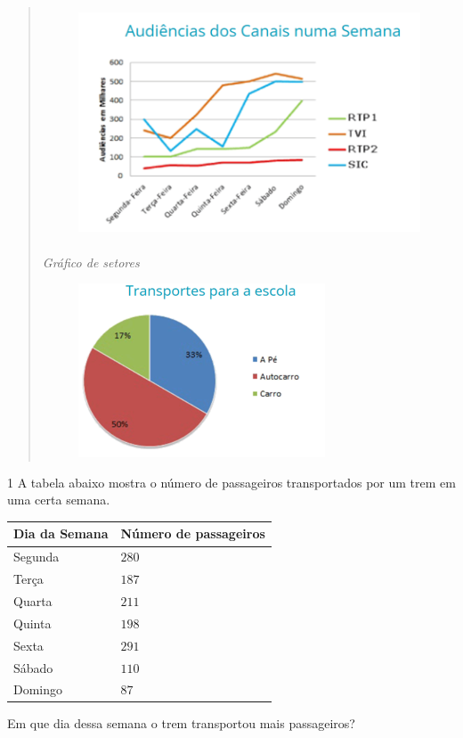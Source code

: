 {\begin{quote}
\begin{figure}
\includegraphics[width=4.1875in,height=2.6875in]{./imgSAEB_6_MAT/media/image79.png}
\end{figure}

\noindent\textit{Gráfico de setores}\\

\begin{figure}
\includegraphics[width=2.88542in,height=2.03125in]{./imgSAEB_6_MAT/media/image80.png}
\end{figure}
\end{quote}


\num{1}  A tabela abaixo mostra o número de passageiros transportados por um
trem em uma certa semana.

\begin{longtable}[]{@{}ll@{}}
\toprule
Dia da Semana & Número de passageiros\tabularnewline
\midrule
\endhead
Segunda & $280$\tabularnewline
Terça & $187$\tabularnewline
Quarta & $211$\tabularnewline
Quinta & $198$\tabularnewline
Sexta & $291$\tabularnewline
Sábado & $110$\tabularnewline
Domingo & $87$\tabularnewline
\bottomrule
\end{longtable}

Em que dia dessa semana o trem transportou mais passageiros?

}
